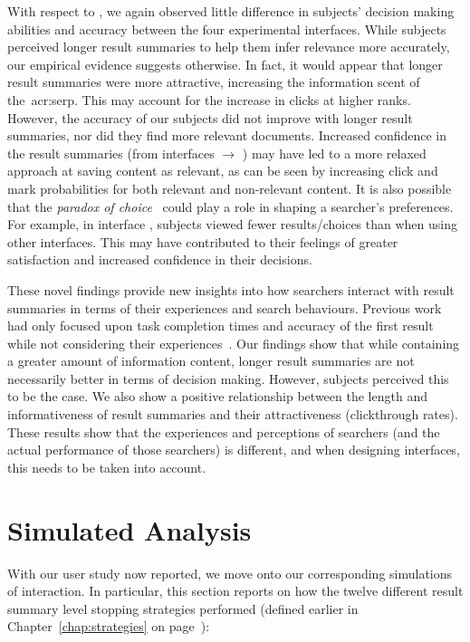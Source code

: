 With respect to , we again observed little difference in subjects' decision making abilities and accuracy between the four experimental interfaces. While subjects perceived longer result summaries to help them infer relevance more accurately, our empirical evidence suggests otherwise. In fact, it would appear that longer result summaries were more attractive, increasing the information scent of the~\gls{acr:serp}. This may account for the increase in clicks at higher ranks. However, the accuracy of our subjects did not improve with longer result summaries, nor did they find more relevant documents. Increased confidence in the result summaries (from interfaces  $\rightarrow$ ) may have led to a more relaxed approach at saving content as relevant, as can be seen by increasing click and mark probabilities for both relevant and non-relevant content. It is also possible that the \emph{paradox of choice}~\citep{oulasvirta2009serp_size} could play a role in shaping a searcher's preferences. For example, in interface , subjects viewed fewer results/choices than when using other interfaces. This may have contributed to their feelings of greater satisfaction and increased confidence in their decisions.

These novel findings provide new insights into how searchers interact with result summaries in terms of their experiences and search behaviours. Previous work had only focused upon task completion times and accuracy of the first result while not considering their experiences~\citep{cutrell2007eye_tracking, kaisser2008improving}. Our findings show that while containing a greater amount of information content, longer result summaries are not necessarily better in terms of decision making. However, subjects perceived this to be the case. We also show a positive relationship between the length and informativeness of result summaries and their attractiveness (clickthrough rates). These results show that the experiences and perceptions of searchers (and the actual performance of those searchers) is different, and when designing interfaces, this needs to be taken into account.

\section{Simulated Analysis}\label{sec:snippets:simulations}
With our user study now reported, we move onto our corresponding simulations of interaction. In particular, this section reports on how the twelve different result summary level stopping strategies performed (defined earlier in Chapter~\ref{chap:strategies} on page~\pageref{chap:strategies}):

